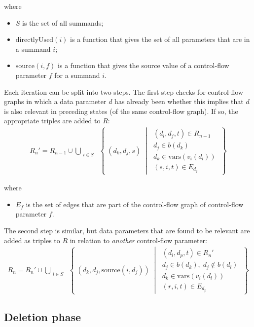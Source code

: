 where

\begin{itemize}
\item $S$ is the set of all summands;
\item $\text{directlyUsed}(i)$ is a function that gives the set of all parameters that are  in a summand $i$;
\item $\text{source}(i, f)$ is a function that gives the source value of a control-flow parameter $f$ for a summand $i$.
\end{itemize}

Each iteration can be split into two steps.
The first step checks for control-flow graphs in which a data parameter $d$ has already been  whether this implies that $d$ is also relevant in preceding states (of the same control-flow graph).
If so, the appropriate triples are added to $R$:
\begin{align*}
R_{n}{'} = R_{n-1} \cup \bigcup\limits_{\substack{i \in S}}^{} \;\left\{\; (d_k, d_j, s) \;\middle|\; \substack{(d_l, d_j, t) \in R_{n-1} \\ d_j \in b(d_k) \\ d_k \in \text{vars}(v_i(d_l)) \\ (s, i, t) \in E_{d_j}} \;\right\}
\end{align*}

where

\begin{itemize}
\item $E_{f}$ is the set of edges that are part of the control-flow graph of control-flow parameter $f$.
\end{itemize}

The second step is similar, but data parameters that are found to be relevant are added as triples to $R$ in relation to \emph{another} control-flow parameter:
\begin{align*}
R_{n} = R_{n}{'} \cup \bigcup\limits_{\substack{i \in S}}^{} \;\left\{\; (d_k, d_j, \text{source}(i, d_j)) \;\middle|\; \substack{(d_l, d_p, t) \in R_{n}{'} \\ d_j \in b(d_k),\; d_j \notin b(d_l) \\ d_k \in \text{vars}(v_i(d_l)) \\ (r, i, t) \in E_{d_p}} \;\right\}
\end{align*}

\subsection{Deletion phase}

